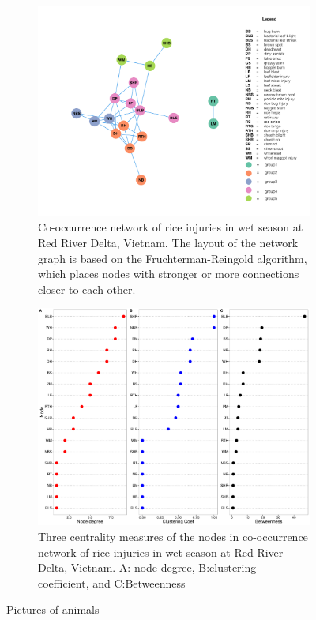 \begin{figure}
    \centering
    \begin{subfigure}[b]{1\textwidth}
        \includegraphics[width = 1\textwidth]{figures/networkRR_ws.pdf}
        \caption{Co-occurrence network of rice injuries in wet season at Red River Delta, Vietnam. The layout of the network graph is based on the Fruchterman-Reingold algorithm, which places nodes with stronger or more connections closer to each other.}
        \label{fig:gull}
    \end{subfigure}
    \begin{subfigure}[b]{1\textwidth}
        \includegraphics[width = 1\textwidth]{figures/nodepropRR_ws.pdf}
        \caption{Three centrality measures of the nodes in co-occurrence network of rice injuries in wet season at Red River Delta, Vietnam. A: node degree, B:clustering coefficient, and C:Betweenness}
        \label{fig:nodepropCP_ds}
    \end{subfigure}
    \caption{Pictures of animals}
    \label{fig:animals}
\end{figure}


